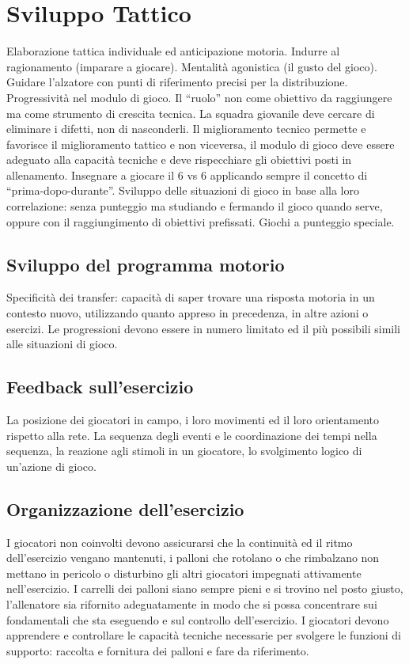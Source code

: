 \section{Sviluppo Tattico}\label{svtattico}
Elaborazione tattica individuale ed anticipazione motoria.
Indurre al ragionamento (imparare a giocare).
Mentalità agonistica (il gusto del gioco).
Guidare l'alzatore con punti di riferimento precisi per la distribuzione.
Progressività nel modulo di gioco.
Il “ruolo” non come obiettivo da raggiungere ma come strumento di crescita tecnica.
La squadra giovanile deve cercare di eliminare i difetti, non di nasconderli.
Il miglioramento tecnico permette e favorisce il miglioramento tattico e non viceversa, il modulo di gioco deve essere adeguato alla capacità tecniche e deve rispecchiare gli obiettivi posti in allenamento.
Insegnare a giocare il 6 vs 6 applicando sempre il concetto di “prima-dopo-durante”.
Sviluppo delle situazioni di gioco in base alla loro correlazione: senza punteggio ma studiando e fermando il gioco quando serve, oppure con il raggiungimento di obiettivi prefissati.
Giochi a punteggio speciale.

\subsection{Sviluppo del programma motorio}
Specificità dei transfer: capacità di saper trovare una risposta motoria in un contesto nuovo, utilizzando quanto appreso in precedenza, in altre azioni o esercizi.
Le progressioni devono essere in numero limitato ed il più possibili simili alle situazioni di gioco.

\subsection{Feedback sull'esercizio}
La posizione dei giocatori in campo, i loro movimenti ed il loro orientamento rispetto alla rete.
La sequenza degli eventi e le coordinazione dei tempi nella sequenza, la reazione agli stimoli in un giocatore, lo svolgimento logico di un'azione di gioco.

\subsection{Organizzazione dell'esercizio}
I giocatori non coinvolti devono assicurarsi che la continuità ed il ritmo dell'esercizio vengano mantenuti, i palloni che rotolano o che rimbalzano non mettano in pericolo o disturbino gli altri giocatori impegnati attivamente nell'esercizio. I carrelli dei palloni siano sempre pieni e si trovino nel posto giusto, l'allenatore sia rifornito adeguatamente in modo che si possa concentrare sui fondamentali che sta eseguendo e sul controllo dell'esercizio.
I giocatori devono apprendere e controllare le capacità tecniche necessarie per svolgere le funzioni di supporto: raccolta e fornitura dei palloni e fare da riferimento.

